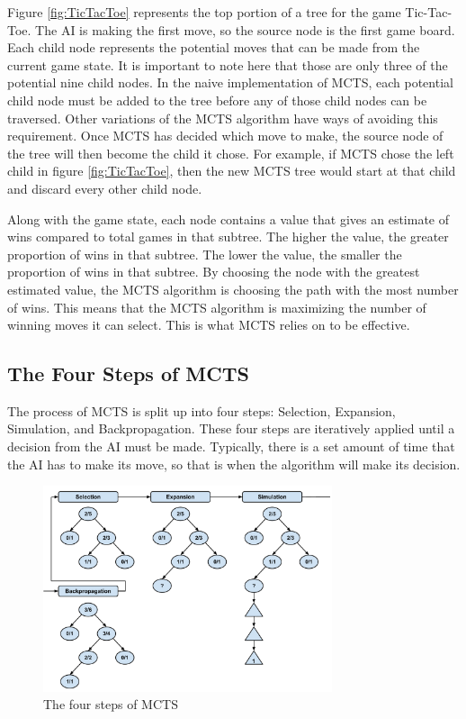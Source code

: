 \documentclass{sig-alternate}
\begin{document}
Figure \ref{fig:TicTacToe} represents the top portion of a tree for the game Tic-Tac-Toe. The AI is making the first move, so the source node is the first game board. Each child node represents the potential moves that can be made from the current game state. It is important to note here that those are only three of the potential nine child nodes. In the naive implementation of MCTS, each potential child node must be added to the tree before any of those child nodes can be traversed. Other variations of the MCTS algorithm have ways of avoiding this requirement\cite{ActionSelection}. Once MCTS has decided which move to make, the source node of the tree will then become the child it chose. For example, if MCTS chose the left child in figure \ref{fig:TicTacToe}, then the new MCTS tree would start at that child and discard every other child node. 

Along with the game state, each node contains a value that gives an estimate of wins compared to total games in that subtree. The higher the value, the greater proportion of wins in that subtree. The lower the value, the smaller the proportion of wins in that subtree. By choosing the node with the greatest estimated value, the MCTS algorithm is choosing the path with the most number of wins. This means that the MCTS algorithm is maximizing the number of winning moves it can select. This is what MCTS relies on to be effective.

\subsection{The Four Steps of MCTS}
The process of MCTS is split up into four steps: Selection, Expansion, Simulation, and Backpropagation. These four steps are iteratively applied until a decision from the AI must be made. Typically, there is a set amount of time that the AI has to make its move, so that is when the algorithm will make its decision.

\begin{figure}[h]
	\includegraphics[width=8.5cm]{MCTSFourStepProcess.pdf}
	\centering
	\caption{The four steps of MCTS}
	\label{fig:FourSteps}
\end{figure}
\end{document}
